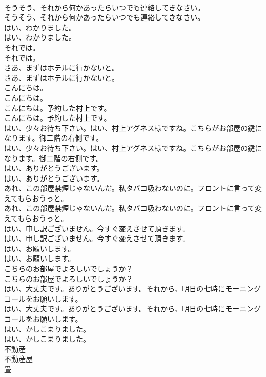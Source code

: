 \documentclass[8pt]{extreport}
\begin{document}
\begin{CJK}{UTF8}{min}
\\	そうそう、それから何かあったらいつでも連絡してきなさい。	
\\	そうそう、それから何かあったらいつでも連絡してきなさい。 
\\	はい、わかりました。	
\\	はい、わかりました。 
\\	それでは。	
\\	それでは。 
\\	さあ、まずはホテルに行かないと。	
\\	さあ、まずはホテルに行かないと。 
\\	こんにちは。	
\\	こんにちは。 
\\	こんにちは。予約した村上です。	
\\	こんにちは。予約した村上です。 
\\	はい、少々お待ち下さい。はい、村上アグネス様ですね。こちらがお部屋の鍵になります。御二階の右側です。	
\\	はい、少々お待ち下さい。はい、村上アグネス様ですね。こちらがお部屋の鍵になります。御二階の右側です。 
\\	はい、ありがとうございます。	
\\	はい、ありがとうございます。 
\\	あれ、この部屋禁煙じゃないんだ。私タバコ吸わないのに。フロントに言って変えてもらおうっと。	
\\	あれ、この部屋禁煙じゃないんだ。私タバコ吸わないのに。フロントに言って変えてもらおうっと。 
\\	はい、申し訳ございません。今すぐ変えさせて頂きます。	
\\	はい、申し訳ございません。今すぐ変えさせて頂きます。 
\\	はい、お願いします。	
\\	はい、お願いします。 
\\	こちらのお部屋でよろしいでしょうか？	
\\	こちらのお部屋でよろしいでしょうか？ 
\\	はい、大丈夫です。ありがとうございます。それから、明日の七時にモーニングコールをお願いします。	
\\	はい、大丈夫です。ありがとうございます。それから、明日の七時にモーニングコールをお願いします。 
\\	はい、かしこまりました。	
\\	はい、かしこまりました。 
\\	不動産
\\	不動産屋
\\	畳

\end{CJK}
\end{document}
